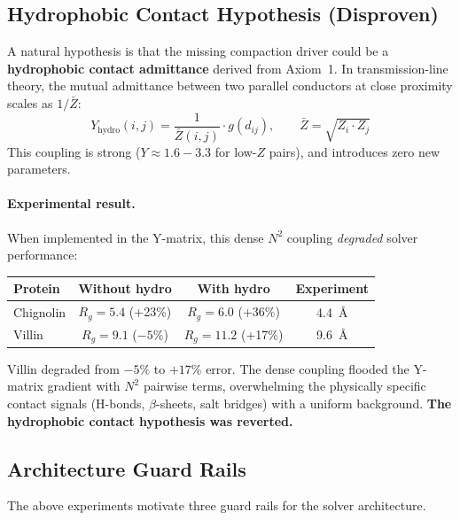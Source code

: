 \subsection{Hydrophobic Contact Hypothesis (Disproven)}
\label{sec:hydrophobic_contact}

A natural hypothesis is that the missing compaction driver could be
a \textbf{hydrophobic contact admittance} derived from Axiom~1.  In
transmission-line theory, the mutual admittance between two parallel
conductors at close proximity scales as $1/\bar{Z}$:
\begin{equation}
    Y_\text{hydro}(i,j) = \frac{1}{\bar{Z}(i,j)} \cdot g(d_{ij}),
    \qquad \bar{Z} = \sqrt{Z_i \cdot Z_j}
\label{eq:y_hydro}
\end{equation}
This coupling is strong ($Y \approx 1.6{-}3.3$ for low-$Z$ pairs),
and introduces zero new parameters.

\paragraph{Experimental result.}
When implemented in the Y-matrix, this dense $N^2$
coupling \emph{degraded} solver performance:
\begin{center}\small
\begin{tabular}{@{}l c c c@{}}
\toprule
\textbf{Protein} & \textbf{Without hydro} & \textbf{With hydro} & \textbf{Experiment} \\
\midrule
Chignolin  & $R_g = 5.4$ (+23\%)  & $R_g = 6.0$ (+36\%)  & 4.4~\AA \\
Villin     & $R_g = 9.1$ ($-5\%$) & $R_g = 11.2$ (+17\%) & 9.6~\AA \\
\bottomrule
\end{tabular}
\end{center}

\noindent Villin degraded from $-5\%$ to $+17\%$ error.  The dense
coupling flooded the Y-matrix gradient with $N^2$ pairwise terms,
overwhelming the physically specific contact signals
(H-bonds, $\beta$-sheets, salt bridges) with a uniform background.
\textbf{The hydrophobic contact hypothesis was reverted.}

\subsection{Architecture Guard Rails}
\label{sec:architecture_guardrails}

The above experiments motivate three guard rails for the solver
architecture.

